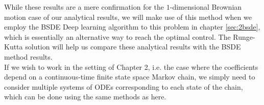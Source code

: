 While these results are a mere confirmation for the $1$-dimensional Brownian motion case of our analytical results, we will make use of this method when we employ the BSDE Deep learning algorithm to this problem in chapter \ref{sec:2bsde}, which is essentially an alternative way to reach the optimal control. The Runge-Kutta solution will help us compare these analytical results with the BSDE method results. \\

If we wish to work in the setting of Chapter 2, i.e. the case where the coefficients depend on a continuous-time finite state space Markov chain, we simply need to consider multiple systems of ODEs corresponding to each state of the chain, which can be done using the same methods as here.



